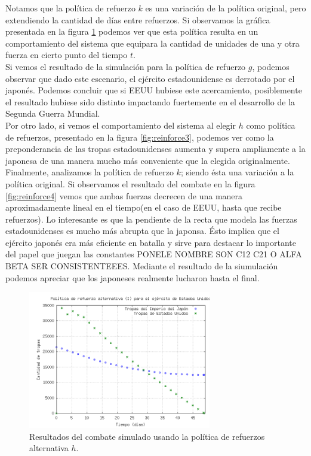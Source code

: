 \documentclass{sig-alternate}
\begin{document}
Notamos que la política de refuerzo $k$ es una variación de la política original, pero extendiendo la cantidad de días entre refuerzos.
Si observamos la gráfica presentada en la figura \ref{fig:reinforce2} podemos ver que esta política resulta en un comportamiento del sistema
que equipara la cantidad de unidades de una y otra fuerza en cierto punto del tiempo $t$.\\
Si vemos el resultado de la simulación para la política de refuerzo $g$, podemos observar que dado este escenario, el ejército estadounidense es derrotado por el japonés. Podemos 
concluir que si EEUU hubiese este acercamiento, posiblemente el resultado hubiese sido distinto impactando fuertemente en el desarrollo de la Segunda Guerra Mundial.\\
Por otro lado, si vemos el comportamiento del sistema al elegir $h$ como política de refuerzos, presentado en la figura \ref{fig:reinforce3}, 
podemos ver como la preponderancia de las tropas estadounidenses aumenta y supera ampliamente a la japonesa de una manera mucho más conveniente que la elegida originalmente.\\
Finalmente, analizamos la política de refuerzo $k$; siendo ésta una variación a la política original. Si observamos el resultado del combate en la figura \ref{fig:reinforce4}
vemos que ambas fuerzas decrecen de una manera aproximadamente lineal en el tiempo(en el caso de EEUU, hasta que recibe refuerzos). Lo interesante es que la pendiente de la recta
que modela las fuerzas estadounidenses es mucho más abrupta que la japonsa. Ésto implica que el ejército japonés era más eficiente en batalla y sirve para destacar lo
importante del papel que juegan las constantes PONELE NOMBRE SON C12 C21 O ALFA BETA SER CONSISTENTEEES. Mediante el resultado de la siumulación podemos apreciar
que los japoneses realmente lucharon hasta el final.

\begin{figure}[h]
\begin{center}
\includegraphics[width=8cm]{reinforce2.png}
\caption{\label{fig:reinforce2}Resultados del combate simulado usando la política de refuerzos alternativa $h$.}
\end{center}
\end{figure}
\end{document}
